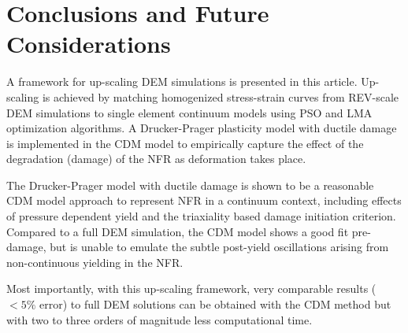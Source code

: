 \chapter{Conclusions and Future Considerations}
A framework for up-scaling DEM simulations is presented in this article. Up-scaling is achieved by matching homogenized stress-strain curves from REV-scale DEM simulations to single element continuum models using PSO and LMA optimization algorithms. A Drucker-Prager plasticity model with ductile damage is implemented in the CDM model to empirically capture the effect of the degradation (damage) of the NFR as deformation takes place.

The Drucker-Prager model with ductile damage is shown to be a reasonable CDM model approach to represent NFR in a continuum context, including effects of pressure dependent yield and the triaxiality based damage initiation criterion. Compared to a full DEM simulation, the CDM model shows a good fit pre-damage, but is unable to emulate the subtle post-yield oscillations arising from non-continuous yielding in the NFR.

Most importantly, with this up-scaling framework, very comparable results ($<5\%$ error) to full DEM solutions can be obtained with the CDM method but with two to three orders of magnitude less computational time.


